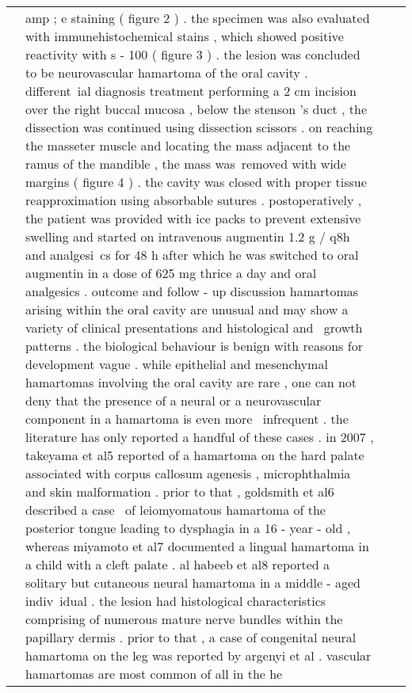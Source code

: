 \documentclass[11pt,a4paper]{article}
\begin{document}
\begin{table}[t]
\begin{tabular}{p{2.7cm} p{1.8cm} l r}
{\begin{comment}
ion was unremarkable as was the systemic examination .  as part of his workup , his complete blood picture was normal . the patient brought with him a ct scan of poor quality and thick cuts . the lesion was not clearly outlined but owing to financial constraint the scan was \
not repeated ( figure 1 ) . no lymphadenopathy was identified on the scan , however .  investigations  histological findings confirmed the diagnosis . the tissue specimen showed haphazard distribution of mature skeletal muscles of varying sizes and nerve fibres closely inter\
twined with each other on h & amp ; e staining ( figure 2 ) . the specimen was also evaluated with immunehistochemical stains , which showed positive reactivity with s - 100 ( figure 3 ) . the lesion was concluded to be neurovascular hamartoma of the oral cavity .  different\
ial diagnosis  treatment  performing a 2 cm incision over the right buccal mucosa , below the stenson 's duct , the dissection was continued using dissection scissors . on reaching the masseter muscle and locating the mass adjacent to the ramus of the mandible , the mass was\
 removed with wide margins ( figure 4 ) . the cavity was closed with proper tissue reapproximation using absorbable sutures . postoperatively , the patient was provided with ice packs to prevent extensive swelling and started on intravenous augmentin 1.2 g / q8h and analgesi\
cs for 48 h after which he was switched to oral augmentin in a dose of 625 mg thrice a day and oral analgesics .  outcome and follow - up  discussion  hamartomas arising within the oral cavity are unusual and may show a variety of clinical presentations and histological and \
growth patterns . the biological behaviour is benign with reasons for development vague . while epithelial and mesenchymal hamartomas involving the oral cavity are rare , one can not deny that the presence of a neural or a neurovascular component in a hamartoma is even more \
infrequent . the literature has only reported a handful of these cases .  in 2007 , takeyama et al5 reported of a hamartoma on the hard palate associated with corpus callosum agenesis , microphthalmia and skin malformation . prior to that , goldsmith et al6 described a case \
of leiomyomatous hamartoma of the posterior tongue leading to dysphagia in a 16 - year - old , whereas miyamoto et al7 documented a lingual hamartoma in a child with a cleft palate . al habeeb et al8 reported a solitary but cutaneous neural hamartoma in a middle - aged indiv\
idual . the lesion had histological characteristics comprising of numerous mature nerve bundles within the papillary dermis . prior to that , a case of congenital neural hamartoma on the leg was reported by argenyi et al . vascular hamartomas are most common of all in the he\

\end{comment}}
\end{tabular}
\end{table}
\end{document}

